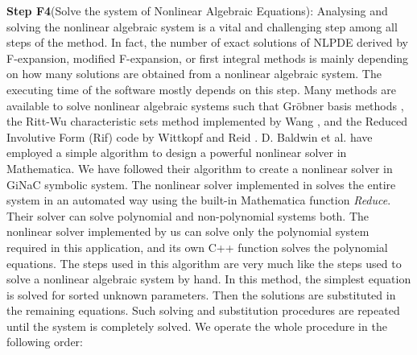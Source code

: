 \documentclass[prd,aps,floats,showkeys,nofootinbib,notitlepage]{revtex4-2}
\begin{document}
	\textbf{Step F4}(Solve the system of Nonlinear Algebraic Equations): Analysing and solving the nonlinear algebraic system is a vital and challenging step among all steps of the method. In fact, the number of exact solutions of NLPDE derived by F-expansion, modified F-expansion, or first integral methods is mainly depending on how many solutions are obtained from a nonlinear algebraic system. The executing time of the software mostly depends on this step. Many methods are available to solve nonlinear algebraic systems such that Gröbner basis methods \cite{grobner}, the Ritt-Wu characteristic sets method implemented by Wang \cite{RittWu,RittWu1}, and the Reduced Involutive Form (Rif) code by Wittkopf and Reid \cite{rif}. D. Baldwin et al. \cite{baldwin} have employed a simple algorithm to design a powerful nonlinear solver in Mathematica. We have followed their algorithm to create a nonlinear solver in GiNaC symbolic system. The nonlinear solver implemented in \cite{baldwin} solves the entire system in an automated way using the built-in Mathematica function \textit{Reduce}. Their solver can solve polynomial and non-polynomial systems both. The nonlinear solver implemented by us can solve only the polynomial system required in this application, and its own C++ function solves the polynomial equations.  
	The steps used in this algorithm are very much like the steps used to solve a nonlinear algebraic system by hand. In this method, the simplest equation is solved for sorted unknown parameters. Then the solutions are substituted in the remaining equations. Such solving and substitution procedures are repeated until the system is completely solved. We operate the whole procedure in the following order:
\end{document}

